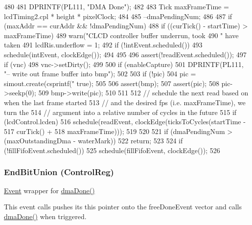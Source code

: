 \begin{DoxyCode}
480 {
481     DPRINTF(PL111, "DMA Done\n");
482 
483     Tick maxFrameTime = lcdTiming2.cpl * height * pixelClock;
484 
485     --dmaPendingNum;
486 
487     if (maxAddr == curAddr && !dmaPendingNum) {
488         if ((curTick() - startTime) > maxFrameTime) {
489             warn("CLCD controller buffer underrun, took %
490                  " have taken %
491             lcdRis.underflow = 1;
492             if (!intEvent.scheduled())
493                 schedule(intEvent, clockEdge());
494         }
495 
496         assert(!readEvent.scheduled());
497         if (vnc)
498             vnc->setDirty();
499 
500         if (enableCapture) {
501             DPRINTF(PL111, "-- write out frame buffer into bmp\n");
502 
503             if (!pic)
504                 pic = simout.create(csprintf("%
      true);
505 
506             assert(bmp);
507             assert(pic);
508             pic->seekp(0);
509             bmp->write(pic);
510         }
511 
512         // schedule the next read based on when the last frame started
513         // and the desired fps (i.e. maxFrameTime), we turn the
514         // argument into a relative number of cycles in the future
515         if (lcdControl.lcden)
516             schedule(readEvent, clockEdge(ticksToCycles(startTime -
517                                                         curTick() +
518                                                         maxFrameTime)));
519     }
520 
521     if (dmaPendingNum > (maxOutstandingDma - waterMark))
522         return;
523 
524     if (!fillFifoEvent.scheduled())
525         schedule(fillFifoEvent, clockEdge());
526 }
\end{DoxyCode}
\hypertarget{classPl111_a1a4be918f70fc01f16ec330702d1042a}{
\subsubsection[{EndBitUnion}]{\setlength{\rightskip}{0pt plus 5cm}EndBitUnion (ControlReg)}}
\label{classPl111_a1a4be918f70fc01f16ec330702d1042a}
\hyperlink{classEvent}{Event} wrapper for \hyperlink{classPl111_a06cfa1e5151d07acbefac240127d471b}{dmaDone()}

This event calls pushes its this pointer onto the freeDoneEvent vector and calls \hyperlink{classPl111_a06cfa1e5151d07acbefac240127d471b}{dmaDone()} when triggered. 


